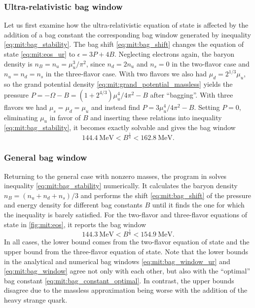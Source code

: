 \subsubsection{Ultra-relativistic bag window}

Let us first examine how the ultra-relativistic equation of state is affected by the addition of a bag constant
the corresponding bag window generated by inequality \eqref{eq:mit:bag_stability}.
The bag shift \eqref{eq:mit:bag_shift} changes the equation of state \eqref{eq:mit:eos_ur} to $\epsilon = 3 P + 4 B$.
Neglecting electrons again, the baryon density is $n_B = n_u = \mu_u^3 / \pi^2$,
since $n_d = 2 n_u$ and $n_s=0$ in the two-flavor case and $n_u=n_d=n_s$ in the three-flavor case.
With two flavors we also had $\mu_d = 2^{1/3} \mu_u$,
so the grand potential density \eqref{eq:mit:grand_potential_massless}
yields the pressure $P = -\Omega - B = (1 + 2^{4/3}) \mu_u^4 / 4 \pi^2 - B$ after ``bagging''.
With three flavors we had $\mu_s = \mu_d = \mu_u$ and instead find $P = 3 \mu_u^4 / 4 \pi^2 - B$.
Setting $P=0$, eliminating $\mu_u$ in favor of $B$ and inserting these relations into inequality \eqref{eq:mit:bag_stability},
it becomes exactly solvable and gives the bag window
\begin{equation}
	\SI{144.4}{\mega\electronvolt} < B^\frac14 < \SI{162.8}{\mega\electronvolt}.
\label{eq:mit:bag_window_ur}
\end{equation}

\subsubsection{General bag window}

Returning to the general case with nonzero masses,
the program in  solves inequality \eqref{eq:mit:bag_stability} numerically.
It calculates the baryon density $n_B = (n_u+n_d+n_s)/3$
and performs the shift \eqref{eq:mit:bag_shift} of the pressure and energy density for different bag constants $B$
until it finds the one for which the inequality is barely satisfied.
For the two-flavor and three-flavor equations of state in \cref{fig:mit:eos}, it reports the bag window
\begin{equation}
	\SI{144.3}{\mega\electronvolt} < B^\frac14 < \SI{154.9}{\mega\electronvolt} .
\label{eq:mit:bag_window}
\end{equation}
In all cases, the lower bound comes from the two-flavor equation of state and the upper bound from the three-flavor equation of state.
Note that the lower bounds in the analytical and numerical bag windows \eqref{eq:mit:bag_window_ur} and \eqref{eq:mit:bag_window}
agree not only with each other, but also with the ``optimal'' bag constant \eqref{eq:mit:bag_constant_optimal}.
In contrast, the upper bounds disagree due to the massless approximation being worse with the addition of the heavy strange quark.


